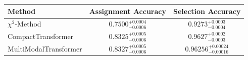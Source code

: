    \begin{tabular}{lcc}
        \toprule
        Method & Assignment Accuracy & Selection Accuracy \\
        \midrule
        $\chi^2$-Method & $0.7500^{+0.0004}_{-0.0006}$ & $0.9273^{+0.0003}_{-0.0004}$ \\
        CompactTransformer & $0.8325^{+0.0005}_{-0.0006}$ & $0.9627^{+0.0002}_{-0.0003}$ \\
        MultiModalTransformer & $0.8327^{+0.0005}_{-0.0006}$ & $0.96256^{+0.00024}_{-0.00016}$ \\
        \bottomrule
    \end{tabular}